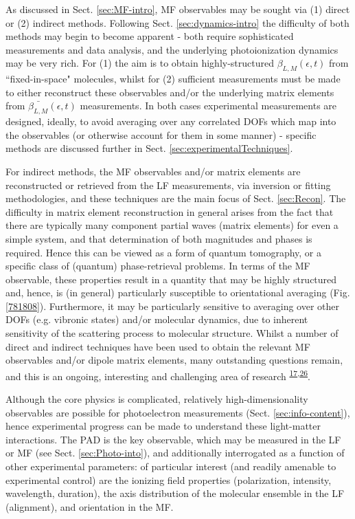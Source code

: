 \documentclass[10pt]{article}
\begin{document}
As discussed in Sect. \ref{sec:MF-intro}, MF observables may be sought via (1) direct or (2) indirect methods. Following Sect. \ref{sec:dynamics-intro} the difficulty of both methods may begin to become apparent - both require sophisticated measurements and data analysis, and the underlying photoionization dynamics may be very rich. For (1) the aim is to obtain highly-structured $\beta_{L,M}(\epsilon,t)$ from ``fixed-in-space" molecules, whilst for (2) sufficient measurements must be made to either reconstruct these observables and/or the underlying matrix elements from $\bar{\beta_{L,M}}(\epsilon,t)$ measurements. In both cases experimental measurements are designed, ideally, to avoid averaging over any correlated DOFs which map into the observables (or otherwise account for them in some manner) - specific methods are discussed further in Sect. \ref{sec:experimentalTechniques}.

For indirect methods, the MF observables and/or matrix elements are reconstructed or retrieved from the LF measurements, via inversion or fitting methodologies, and these techniques are the main focus of Sect. \ref{sec:Recon}. The difficulty in matrix element reconstruction in general arises from the fact that there are typically many component partial waves (matrix elements) for even a simple system, and that determination of both magnitudes and phases is required. Hence this can be viewed as a form of quantum tomography, or a specific class of (quantum) phase-retrieval problems. In terms of the MF observable, these properties result in a quantity that may be highly structured and, hence, is (in general) particularly susceptible to orientational averaging (Fig. \ref{781808}). Furthermore, it may be particularly sensitive to averaging over other DOFs (e.g. vibronic states) and/or molecular dynamics, due to inherent sensitivity of the scattering process to molecular structure. Whilst a number of direct and indirect techniques have been used to obtain the relevant MF observables and/or dipole matrix elements, many outstanding questions remain, and this is an ongoing, interesting and challenging area of research \textsuperscript{\hyperref[csl:17]{17},\hyperref[csl:26]{26}}.

Although the core physics is complicated, relatively high-dimensionality observables are possible for photoelectron measurements (Sect. \ref{sec:info-content}), hence experimental progress can be made to understand these light-matter interactions. The PAD is the key observable, which may be measured in the LF or MF (see Sect. \ref{sec:Photo-into}), and additionally interrogated as a function of other experimental parameters: of particular interest (and readily amenable to experimental control) are the ionizing field properties (polarization, intensity, wavelength, duration), the axis distribution of the molecular ensemble in the LF (alignment), and orientation in the MF. 
\end{document}
